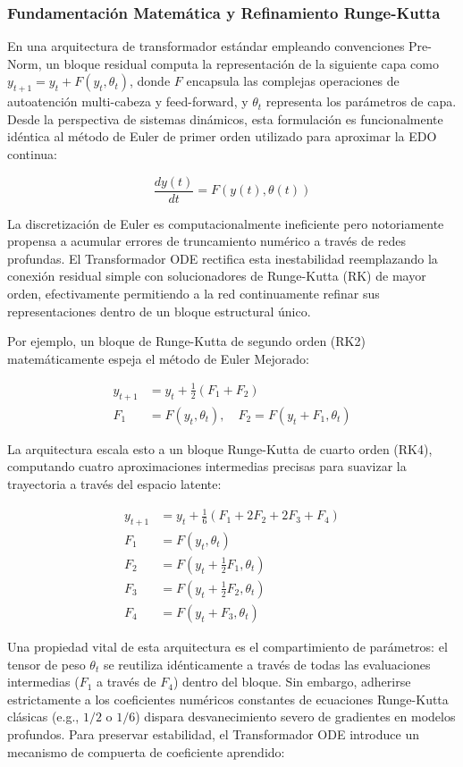 \documentclass[11pt,a4paper]{article}
\begin{document}
\subsubsection{Fundamentación Matemática y Refinamiento Runge-Kutta}

En una arquitectura de transformador estándar empleando convenciones Pre-Norm, un bloque residual computa la representación de la siguiente capa como $y_{t+1} = y_t + F(y_t, \theta_t)$, donde $F$ encapsula las complejas operaciones de autoatención multi-cabeza y feed-forward, y $\theta_t$ representa los parámetros de capa. Desde la perspectiva de sistemas dinámicos, esta formulación es funcionalmente idéntica al método de Euler de primer orden utilizado para aproximar la EDO continua:

$$
\frac{dy(t)}{dt} = F(y(t), \theta(t))
$$

La discretización de Euler es computacionalmente ineficiente pero notoriamente propensa a acumular errores de truncamiento numérico a través de redes profundas. El Transformador ODE rectifica esta inestabilidad reemplazando la conexión residual simple con solucionadores de Runge-Kutta (RK) de mayor orden, efectivamente permitiendo a la red continuamente refinar sus representaciones dentro de un bloque estructural único.

Por ejemplo, un bloque de Runge-Kutta de segundo orden (RK2) matemáticamente espeja el método de Euler Mejorado:

$$
\begin{aligned}
y_{t+1} &= y_t + \frac{1}{2}(F_1 + F_2) \\
F_1 &= F(y_t, \theta_t), \quad F_2 = F(y_t + F_1, \theta_t)
\end{aligned}
$$

La arquitectura escala esto a un bloque Runge-Kutta de cuarto orden (RK4), computando cuatro aproximaciones intermedias precisas para suavizar la trayectoria a través del espacio latente:

$$
\begin{aligned}
y_{t+1} &= y_t + \frac{1}{6}(F_1 + 2F_2 + 2F_3 + F_4) \\
F_1 &= F(y_t, \theta_t) \\
F_2 &= F(y_t + \frac{1}{2}F_1, \theta_t) \\
F_3 &= F(y_t + \frac{1}{2}F_2, \theta_t) \\
F_4 &= F(y_t + F_3, \theta_t)
\end{aligned}
$$

Una propiedad vital de esta arquitectura es el compartimiento de parámetros: el tensor de peso $\theta_t$ se reutiliza idénticamente a través de todas las evaluaciones intermedias ($F_1$ a través de $F_4$) dentro del bloque. Sin embargo, adherirse estrictamente a los coeficientes numéricos constantes de ecuaciones Runge-Kutta clásicas (e.g., $1/2$ o $1/6$) dispara desvanecimiento severo de gradientes en modelos profundos. Para preservar estabilidad, el Transformador ODE introduce un mecanismo de compuerta de coeficiente aprendido:
\end{document}
